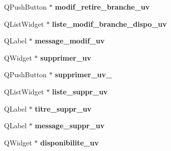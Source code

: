 \begin{DoxyCompactItemize}
\item 
\hypertarget{class_ui___administration_ad91b45e44b24d11177e6301ee1219647}{Q\+Push\+Button $\ast$ {\bfseries modif\+\_\+retire\+\_\+branche\+\_\+uv}}\label{class_ui___administration_ad91b45e44b24d11177e6301ee1219647}

\item 
\hypertarget{class_ui___administration_aecde3732fd1c4c89711f1d207ee2f4d6}{Q\+List\+Widget $\ast$ {\bfseries liste\+\_\+modif\+\_\+branche\+\_\+dispo\+\_\+uv}}\label{class_ui___administration_aecde3732fd1c4c89711f1d207ee2f4d6}

\item 
\hypertarget{class_ui___administration_a1af6e51a7d99d76409907502d33815c6}{Q\+Label $\ast$ {\bfseries message\+\_\+modif\+\_\+uv}}\label{class_ui___administration_a1af6e51a7d99d76409907502d33815c6}

\item 
\hypertarget{class_ui___administration_af0389e62067114cca1a44c2812a4e7a8}{Q\+Widget $\ast$ {\bfseries supprimer\+\_\+uv}}\label{class_ui___administration_af0389e62067114cca1a44c2812a4e7a8}

\item 
\hypertarget{class_ui___administration_ab95dcdc9553cf716870eec02e1b9ae00}{Q\+Push\+Button $\ast$ {\bfseries supprimer\+\_\+uv\+\_}}\label{class_ui___administration_ab95dcdc9553cf716870eec02e1b9ae00}

\item 
\hypertarget{class_ui___administration_a78eb02c59193ee18431d35c6d4d38890}{Q\+List\+Widget $\ast$ {\bfseries liste\+\_\+suppr\+\_\+uv}}\label{class_ui___administration_a78eb02c59193ee18431d35c6d4d38890}

\item 
\hypertarget{class_ui___administration_a11ca86953947d974e21c3fea475a0fb3}{Q\+Label $\ast$ {\bfseries titre\+\_\+suppr\+\_\+uv}}\label{class_ui___administration_a11ca86953947d974e21c3fea475a0fb3}

\item 
\hypertarget{class_ui___administration_adff1771e4fe6623b5426ee41dfa4405c}{Q\+Label $\ast$ {\bfseries message\+\_\+suppr\+\_\+uv}}\label{class_ui___administration_adff1771e4fe6623b5426ee41dfa4405c}

\item 
\hypertarget{class_ui___administration_adbf64b02918d9d1abca630bde1f90721}{Q\+Widget $\ast$ {\bfseries disponibilite\+\_\+uv}}\label{class_ui___administration_adbf64b02918d9d1abca630bde1f90721}


\end{DoxyCompactItemize}
